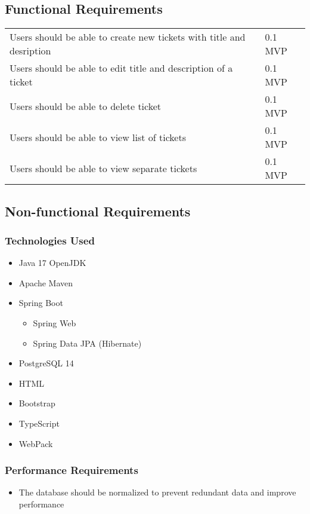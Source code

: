 \documentclass[a4paper]{article}
\begin{document}
    \subsection{Functional Requirements}
    \begin{table}[htbp]
        \centering
        \begin{tabularx}{\linewidth}{|X|l|}
            \hline
            \centering{Description} & \centering{Version} \tabularnewline \hline
            Users should be able to create new tickets with title and desription & 0.1 MVP \tabularnewline \hline
            Users should be able to edit title and description of a ticket & 0.1 MVP \tabularnewline \hline
            Users should be able to delete ticket & 0.1 MVP \tabularnewline \hline
            Users should be able to view list of tickets & 0.1 MVP \tabularnewline \hline
            Users should be able to view separate tickets & 0.1 MVP \tabularnewline \hline
        \end{tabularx}
    \end{table}

    \subsection{Non-functional Requirements}
    \subsubsection{Technologies Used}
    \begin{itemize}
        \item Java 17 OpenJDK
        \item Apache Maven
        \item Spring Boot
        \begin{itemize}
            \item Spring Web
            \item Spring Data JPA (Hibernate)
        \end{itemize}
        \item PostgreSQL 14
        \item HTML
        \item Bootstrap
        \item TypeScript
        \item WebPack
    \end{itemize}

    \subsubsection{Performance Requirements}
    \begin{itemize}
        \item The database should be normalized to prevent redundant data and improve performance
    \end{itemize}
\end{document}
